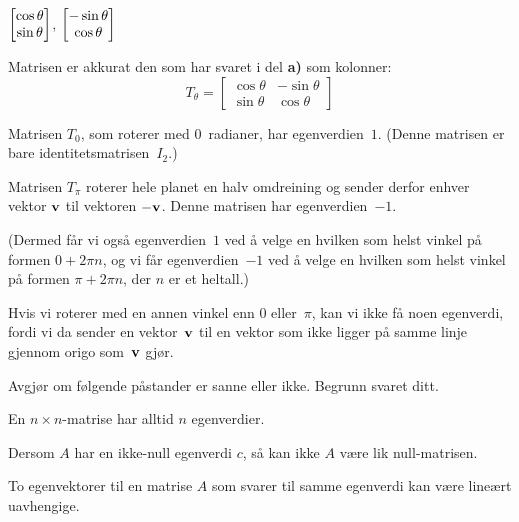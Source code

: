 \begin{losning}

\begin{punkt}
$\begin{bmatrix} \cos\theta \\ \sin\theta \end{bmatrix}$, $\begin{bmatrix} -\sin\theta \\ \cos\theta \end{bmatrix}$
\end{punkt}

\begin{punkt}
Matrisen er akkurat den som har svaret i del \textbf{a)} som kolonner:
$$T_\theta=\begin{bmatrix}
\cos\theta & -\sin\theta\\
\sin\theta & \cos\theta
\end{bmatrix}$$
\end{punkt}

\begin{punkt}
Matrisen $T_0$, som roterer med $0$~radianer,
har egenverdien~$1$.
(Denne matrisen er bare identitetsmatrisen~$I_2$.)

Matrisen $T_\pi$ roterer hele planet en halv omdreining
og sender derfor enhver vektor $\mathbf{v}$ til vektoren $-\mathbf{v}$.
Denne matrisen har egenverdien~$-1$.

(Dermed får vi også egenverdien~$1$ ved å velge en hvilken som helst vinkel
på formen $0 + 2\pi n$,
og vi får egenverdien~$-1$ ved å velge en hvilken som helst vinkel
på formen $\pi + 2\pi n$, der $n$ er et heltall.)

Hvis vi roterer med en annen vinkel enn $0$ eller~$\pi$,
kan vi ikke få noen egenverdi,
fordi vi da sender en vektor~$\mathbf{v}$ til en vektor som
ikke ligger på samme linje gjennom origo som~$\mathbf{v}$ gjør.
\end{punkt}

\end{losning}

\begin{oppgave}
Avgjør om følgende påstander er sanne eller ikke. Begrunn svaret ditt.

\begin{punkt}
En $n\times n$-matrise har alltid $n$ egenverdier.
\end{punkt}

\begin{punkt}
Dersom $A$ har en ikke-null egenverdi $c$, så kan ikke $A$ være lik null-matrisen.
\end{punkt}


\begin{punkt}
To egenvektorer til en matrise $A$ som svarer til samme egenverdi kan være lineært uavhengige.
\end{punkt}



\end{oppgave}

